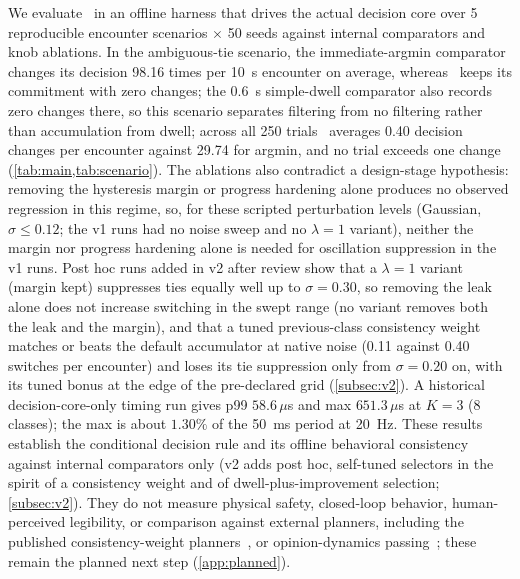 We evaluate \sname\ in an offline harness that drives the actual decision core over 5 reproducible encounter scenarios $\times$ 50 seeds against internal comparators and knob ablations. In the ambiguous-tie scenario, the immediate-argmin comparator changes its decision 98.16 times per 10~s encounter on average, whereas \sname\ keeps its commitment with zero changes; the 0.6~s simple-dwell comparator also records zero changes there, so this scenario separates filtering from no filtering rather than accumulation from dwell; across all 250 trials \sname\ averages 0.40 decision changes per encounter against 29.74 for argmin, and no trial exceeds one change (\cref{tab:main,tab:scenario}). The ablations also contradict a design-stage hypothesis: removing the hysteresis margin or progress hardening alone produces no observed regression in this regime, so, for these scripted perturbation levels (Gaussian, $\sigma\le0.12$; the v1 runs had no noise sweep and no $\lambda=1$ variant), neither the margin nor progress hardening alone is needed for oscillation suppression in the v1 runs. Post hoc runs added in v2 after review show that a $\lambda=1$ variant (margin kept) suppresses ties equally well up to $\sigma=0.30$, so removing the leak alone does not increase  switching in the swept range (no variant removes both the leak and the margin), and that a tuned previous-class consistency weight matches or beats the default accumulator at native noise (0.11 against 0.40 switches per encounter) and loses its tie suppression only from $\sigma=0.20$ on, with its tuned bonus at the edge of the pre-declared grid (\cref{subsec:v2}). A historical decision-core-only timing run gives p99 $58.6\,\mu$s and max $651.3\,\mu$s at $K=3$ (8 classes); the max is about $1.30\%$ of the 50~ms period at 20~Hz. These results establish the conditional decision rule and its offline behavioral consistency against internal comparators only (v2 adds post hoc, self-tuned selectors in the spirit of a consistency weight and of dwell-plus-improvement selection; \cref{subsec:v2}). They do not measure physical safety, closed-loop behavior, human-perceived legibility, or comparison against external planners, including the published consistency-weight planners~\citep{degroot2024topology,martinezbaselga2026shine}, or opinion-dynamics passing~\citep{cathcart2023opinion}; these remain the planned next step (\cref{app:planned}).

